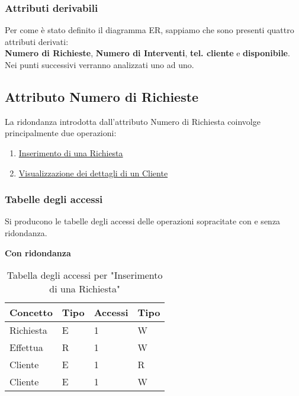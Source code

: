 \documentclass{article}
\begin{document}
\subsubsection{Attributi derivabili}

Per come è stato definito il diagramma ER, sappiamo che sono presenti quattro attributi derivati: \\ \textbf{Numero di Richieste}, \textbf{Numero di Interventi}, \textbf{tel. cliente} e \textbf{disponibile}.\\
Nei punti successivi verranno analizzati uno ad uno.

\newpage

\subsection{Attributo Numero di Richieste}

La ridondanza introdotta dall'attributo Numero di Richiesta coinvolge principalmente due operazioni:
\begin{enumerate}
    \item \underline{Inserimento di una Richiesta}
    \item \underline{Visualizzazione dei dettagli di un Cliente}
\end{enumerate}

\subsubsection{Tabelle degli accessi}

Si producono le tabelle degli accessi delle operazioni sopracitate con e senza ridondanza.

\textbf{Con ridondanza}

\begin{table}[h]
    \centering
    \begin{adjustbox}{width=0.6\textwidth}
        \begin{tabular}{|m{2cm}|m{2cm}|m{2cm}|m{2cm}|}
            \hline  
            \textbf{Concetto} & \textbf{Tipo} & \textbf{Accessi} & \textbf{Tipo}\\ 
            \hline
            Richiesta & E & 1 & W\\
            \hline
            Effettua & R & 1 & W\\
            \hline
            Cliente & E & 1 & R\\
            \hline
            Cliente & E & 1 & W\\
            \hline
        \end{tabular}
    \end{adjustbox}
    \caption{Tabella degli accessi per "Inserimento di una Richiesta" }
    \label{tab:accesstable1}
\end{table}
\end{document}
